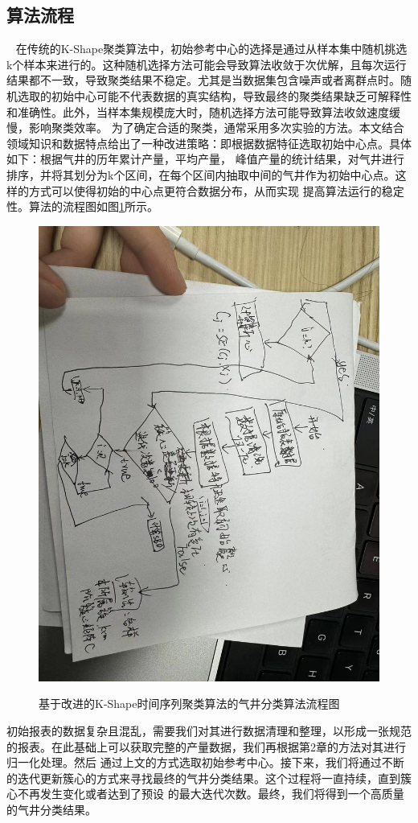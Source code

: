 \subsection{算法流程}\
\label{sec:K-Shapeprocess}
在传统的K-Shape聚类算法中，初始参考中心的选择是通过从样本集中随机挑选k个样本来进行的。这种随机选择方法可能会导致算法收敛于次优解，且每次运行结果都不一致，导致聚类结果不稳定。尤其是当数据集包含噪声或者离群点时。随机选取的初始中心可能不代表数据的真实结构，导致最终的聚类结果缺乏可解释性和准确性。此外，当样本集规模庞大时，随机选择方法可能导致算法收敛速度缓慢，影响聚类效率。
为了确定合适的聚类，通常采用多次实验的方法。本文结合领域知识和数据特点给出了一种改进策略：即根据数据特征选取初始中心点。具体如下：根据气井的历年累计产量，平均产量，
峰值产量的统计结果，对气井进行排序，并将其划分为k个区间，在每个区间内抽取中间的气井作为初始中心点。这样的方式可以使得初始的中心点更符合数据分布，从而实现
提高算法运行的稳定性。算法的流程图如图\ref{fig:K-Shape}所示。
\begin{figure}
    \centering
    \includegraphics[scale=0.15,angle=0]{figure/K-Shape.jpg}\\
    \caption{基于改进的K-Shape时间序列聚类算法的气井分类算法流程图}
    \label{fig:K-Shape}
\end{figure}
初始报表的数据复杂且混乱，需要我们对其进行数据清理和整理，以形成一张规范的报表。在此基础上可以获取完整的产量数据，我们再根据第2章的方法对其进行归一化处理。然后
通过上文的方式选取初始参考中心。接下来，我们将通过不断的迭代更新簇心的方式来寻找最终的气井分类结果。这个过程将一直持续，直到簇心不再发生变化或者达到了预设
的最大迭代次数。最终，我们将得到一个高质量的气井分类结果。
